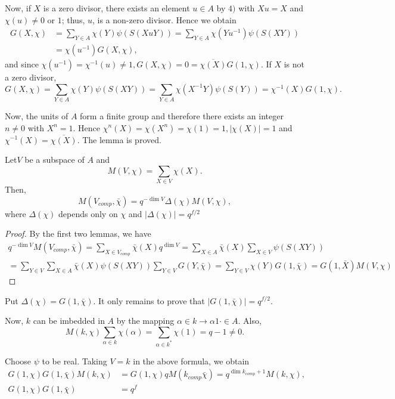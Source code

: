 Now, if $X$ is a zero divisor, there exists an element $u \in A$ by
$4)$ with $Xu=X$ and $\chi (u)\neq 0$ or $1$; thus, $u$, is a non-zero
divisor. Hence we obtain 
\begin{align*}
  G(X,\chi) &= \sum_{Y \in A} \chi (Y) \psi (S(XuY))= \sum_{Y \in A}
  \chi (Y u^{-1}) \psi (S(XY))\\ 
  &= \chi (u^{-1})G(X,\chi),
\end{align*}
and since $\chi (u^{-1})=\chi^{-1}(u)\neq 1,G(X, \chi)=0 =
\overline{\chi (X)}G(1, \chi)$. If $X$ is not a zero divisor, 
$$
G(X,\chi)=\sum_{Y \in A} \chi(Y) \psi (S(XY))= \sum_{Y \in A} \chi
(X^{-1}Y)\psi (S(Y))=\chi^{-1}(X)G(1,\chi). 
$$

Now, the units of $A$ form a finite group and therefore there
exists an integer $n \neq 0$ with $X^n=1$. Hence $\chi^n(X)=\chi
(X^n)=\chi(1)=1, |\chi(X)|=1$ and
$\chi^{-1}(X)=\overline{\chi(X)}$. The lemma is proved. 

\begin{Lemma}\label{chap17:sec31:lem3}%
  Let\pageoriginale $V$ be a subspace of $A$ and
  $$
  M(V,\chi)=\sum_{X \in V}\chi (X).
  $$
  Then,
  $$
  M(V_{comp}, \bar{\chi})=q^{-\dim V}\Delta (\chi)M(V, \chi),
  $$
  where $\Delta (\chi)$ depends only on $\chi$ and $|\Delta (\chi)|=q^{f/2}$
\end{Lemma}

\begin{proof}
  By the first two lemmas, we have
{\fontsize{10pt}{12pt}\selectfont
  \begin{gather*}
    q^{-\dim V}M(V_{comp}, \bar{\chi})=\sum_{X \in
      V_{comp}}\bar{\chi}(X)q^{\dim V}=\sum_{X \in
      A}\bar{\chi}(X)\sum_{X \in V}\psi (S(XY))  \\
    =\sum_{Y \in V}\sum_{X \in A}\bar{\chi}(X)\psi (S(XY))\sum_{Y \in
      V}G(Y, \bar{\chi})=\sum_{Y \in V}\chi(Y)G(1, \bar{\chi})= G(1,
    \bar{X}) M(V, \chi) 
  \end{gather*}}\relax
\end{proof}

Put $\Delta (\chi)=G(1, \bar{\chi})$. It only remains to prove that
$|G(1, \bar{\chi})|=q^{f/2}$. 

Now, $k$ can be imbedded in $A$ by the mapping $\alpha \in k \to
\alpha 1\cdot \in A$. Also, 
$$
M(k,\chi)\sum_{\alpha \in k} \chi (\alpha)= \sum_{\alpha \in k^*}
\chi(1)=q-1 \neq 0. 
$$

Choose $\psi$ to be real. Taking $V=k$ in the above formula, we obtain 
\begin{align*}
  G(1,\chi)G(1,\bar{\chi})M(k,\chi) & = G (1,\chi)q M
  (k_{comp}\bar{\chi}) = q^{\dim k_{comp}+1} M(k, \chi), \\
  G(1,\chi)G(1, \bar{\chi})& =q^f
\end{align*}

